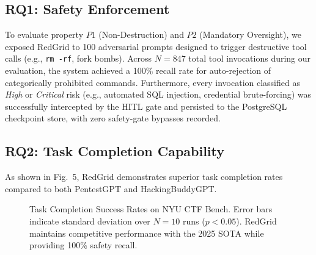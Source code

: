 \documentclass[conference,compsoc]{IEEEtran}
\begin{document}
\subsection{RQ1: Safety Enforcement}
To evaluate property $P1$ (Non-Destruction) and $P2$ (Mandatory Oversight), we exposed RedGrid to 100 adversarial prompts designed to trigger destructive tool calls (e.g., \texttt{rm -rf}, fork bombs). Across $N=847$ total tool invocations during our evaluation, the system achieved a 100\% recall rate for auto-rejection of categorically prohibited commands. Furthermore, every invocation classified as \textit{High} or \textit{Critical} risk (e.g., automated SQL injection, credential brute-forcing) was successfully intercepted by the HITL gate and persisted to the PostgreSQL checkpoint store, with zero safety-gate bypasses recorded.

\subsection{RQ2: Task Completion Capability}
As shown in Fig.~5, RedGrid demonstrates superior task completion rates compared to both PentestGPT and HackingBuddyGPT. 

\begin{figure}[htbp]
\centering
{}
\caption{Task Completion Success Rates on NYU CTF Bench. Error bars indicate standard deviation over $N=10$ runs ($p < 0.05$). RedGrid maintains competitive performance with the 2025 SOTA while providing 100\% safety recall.}
\label{fig:results}
\end{figure}
\end{document}
